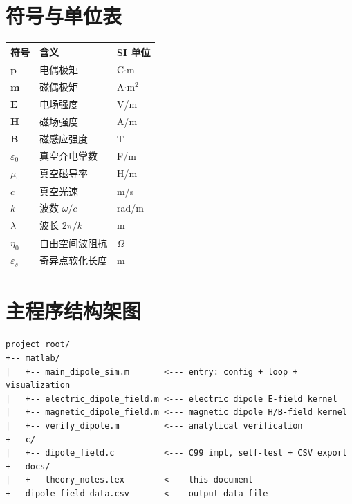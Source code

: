 \documentclass[11pt,a4paper]{article}
\newcommand{\eps}{\varepsilon}
\newcommand{\epso}{\varepsilon_{0}}
\newcommand{\muo}{\mu_{0}}
\newcommand{\pvec}{\bm p}
\newcommand{\mvec}{\bm m}
\newcommand{\Evec}{\bm E}
\newcommand{\Hvec}{\bm H}
\newcommand{\Bvec}{\bm B}
\begin{document}
\appendix
\section{符号与单位表}
\begin{center}
\begin{tabular}{@{}lll@{}}\toprule
符号 & 含义 & SI 单位 \\ \midrule
$\pvec$   & 电偶极矩       & C$\cdot$m \\
$\mvec$   & 磁偶极矩       & A$\cdot$m$^{2}$ \\
$\Evec$   & 电场强度       & V/m \\
$\Hvec$   & 磁场强度       & A/m \\
$\Bvec$   & 磁感应强度     & T \\
$\epso$   & 真空介电常数   & F/m \\
$\muo$    & 真空磁导率       & H/m \\
$c$       & 真空光速           & m/s \\
$k$       & 波数 $\omega/c$   & rad/m \\
$\lambda$ & 波长 $2\pi/k$     & m \\
$\eta_{0}$& 自由空间波阻抗   & $\Omega$ \\
$\eps_{s}$& 奇异点软化长度   & m \\ \bottomrule
\end{tabular}
\end{center}

\section{主程序结构架图}\label{app:matlab}
\begin{lstlisting}
project root/
+-- matlab/
|   +-- main_dipole_sim.m       <--- entry: config + loop + visualization
|   +-- electric_dipole_field.m <--- electric dipole E-field kernel
|   +-- magnetic_dipole_field.m <--- magnetic dipole H/B-field kernel
|   +-- verify_dipole.m         <--- analytical verification
+-- c/
|   +-- dipole_field.c          <--- C99 impl, self-test + CSV export
+-- docs/
|   +-- theory_notes.tex        <--- this document
+-- dipole_field_data.csv       <--- output data file
\end{lstlisting}
\end{document}
